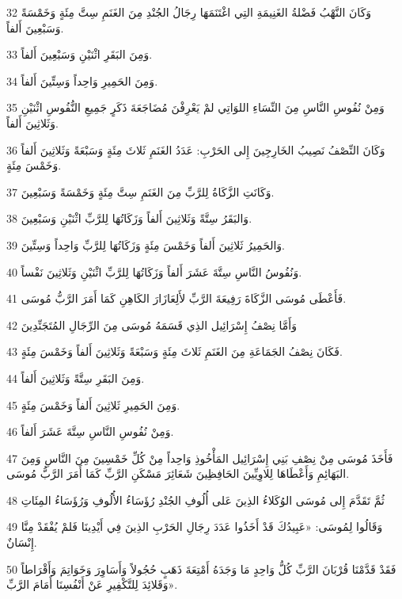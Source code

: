 \par 32 وَكَانَ النَّهْبُ فَضْلةُ الغَنِيمَةِ التِي اغْتَنَمَهَا رِجَالُ الجُنْدِ مِنَ الغَنَمِ سِتَّ مِئَةٍ وَخَمْسَةً وَسَبْعِينَ أَلفاً.
\par 33 وَمِنَ البَقَرِ اثْنَيْنِ وَسَبْعِينَ أَلفاً.
\par 34 وَمِنَ الحَمِيرِ وَاحِداً وَسِتِّينَ أَلفاً.
\par 35 وَمِنْ نُفُوسِ النَّاسِ مِنَ النِّسَاءِ اللوَاتِي لمْ يَعْرِفْنَ مُضَاجَعَةَ ذَكَرٍ جَمِيعِ النُّفُوسِ اثْنَيْنِ وَثَلاثِينَ أَلفاً.
\par 36 وَكَانَ النِّصْفُ نَصِيبُ الخَارِجِينَ إِلى الحَرْبِ: عَدَدُ الغَنَمِ ثَلاثَ مِئَةٍ وَسَبْعَةً وَثَلاثِينَ أَلفاً وَخَمْسَ مِئَةٍ.
\par 37 وَكَانَتِ الزَّكَاةُ لِلرَّبِّ مِنَ الغَنَمِ سِتَّ مِئَةٍ وَخَمْسَةً وَسَبْعِينَ.
\par 38 وَالبَقَرُ سِتَّةً وَثَلاثِينَ أَلفاً وَزَكَاتُهَا لِلرَّبِّ اثْنَيْنِ وَسَبْعِينَ.
\par 39 وَالحَمِيرُ ثَلاثِينَ أَلفاً وَخَمْسَ مِئَةٍ وَزَكَاتُهَا لِلرَّبِّ وَاحِداً وَسِتِّينَ.
\par 40 وَنُفُوسُ النَّاسِ سِتَّةَ عَشَرَ أَلفاً وَزَكَاتُهَا لِلرَّبِّ اثْنَيْنِ وَثَلاثِينَ نَفْساً.
\par 41 فَأَعْطَى مُوسَى الزَّكَاةَ رَفِيعَةَ الرَّبِّ لأَلِعَازَارَ الكَاهِنِ كَمَا أَمَرَ الرَّبُّ مُوسَى.
\par 42 وَأَمَّا نِصْفُ إِسْرَائِيل الذِي قَسَمَهُ مُوسَى مِنَ الرِّجَالِ المُتَجَنِّدِينَ
\par 43 فَكَانَ نِصْفُ الجَمَاعَةِ مِنَ الغَنَمِ ثَلاثَ مِئَةٍ وَسَبْعَةً وَثَلاثِينَ أَلفاً وَخَمْسَ مِئَةٍ.
\par 44 وَمِنَ البَقَرِ سِتَّةً وَثَلاثِينَ أَلفاً.
\par 45 وَمِنَ الحَمِيرِ ثَلاثِينَ أَلفاً وَخَمْسَ مِئَةٍ.
\par 46 وَمِنْ نُفُوسِ النَّاسِ سِتَّةَ عَشَرَ أَلفاً.
\par 47 فَأَخَذَ مُوسَى مِنْ نِصْفِ بَنِي إِسْرَائِيل المَأْخُوذِ وَاحِداً مِنْ كُلِّ خَمْسِينَ مِنَ النَّاسِ وَمِنَ البَهَائِمِ وَأَعْطَاهَا لِلاوِيِّينَ الحَافِظِينَ شَعَائِرَ مَسْكَنِ الرَّبِّ كَمَا أَمَرَ الرَّبُّ مُوسَى.
\par 48 ثُمَّ تَقَدَّمَ إِلى مُوسَى الوُكَلاءُ الذِينَ عَلى أُلُوفِ الجُنْدِ رُؤَسَاءُ الأُلُوفِ وَرُؤَسَاءُ المِئَاتِ
\par 49 وَقَالُوا لِمُوسَى: «عَبِيدُكَ قَدْ أَخَذُوا عَدَدَ رِجَالِ الحَرْبِ الذِينَ فِي أَيْدِينَا فَلمْ يُفْقَدْ مِنَّا إِنْسَانٌ.
\par 50 فَقَدْ قَدَّمْنَا قُرْبَانَ الرَّبِّ كُلُّ وَاحِدٍ مَا وَجَدَهُ أَمْتِعَةَ ذَهَبٍ حُجُولاً وَأَسَاوِرَ وَخَوَاتِمَ وَأَقْرَاطاً وَقَلائِدَ لِلتَّكْفِيرِ عَنْ أَنْفُسِنَا أَمَامَ الرَّبِّ».
